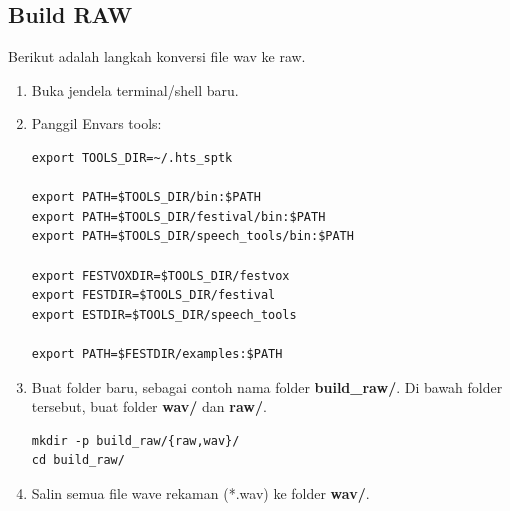 \documentclass[12pt,]{article}
\begin{document}
	\newpage
	\subsection{Build RAW}
	
	Berikut adalah langkah konversi file wav ke raw.
	
	\begin{enumerate}
		\item Buka jendela terminal/shell baru.
		
		\item Panggil Envars tools:
		\begin{verbatim}
export TOOLS_DIR=~/.hts_sptk

export PATH=$TOOLS_DIR/bin:$PATH
export PATH=$TOOLS_DIR/festival/bin:$PATH
export PATH=$TOOLS_DIR/speech_tools/bin:$PATH

export FESTVOXDIR=$TOOLS_DIR/festvox
export FESTDIR=$TOOLS_DIR/festival
export ESTDIR=$TOOLS_DIR/speech_tools

export PATH=$FESTDIR/examples:$PATH
		\end{verbatim}
		
		\item Buat folder baru, sebagai contoh nama folder \textbf{build\_raw/}.
		Di bawah folder tersebut, buat folder \textbf{wav/} dan \textbf{raw/}.
		\begin{verbatim}
mkdir -p build_raw/{raw,wav}/
cd build_raw/
		\end{verbatim}
		
		\item Salin semua file wave rekaman (*.wav) ke folder \textbf{wav/}.
		
%		
%			
%			
%			
	

\end{enumerate}
\end{document}
